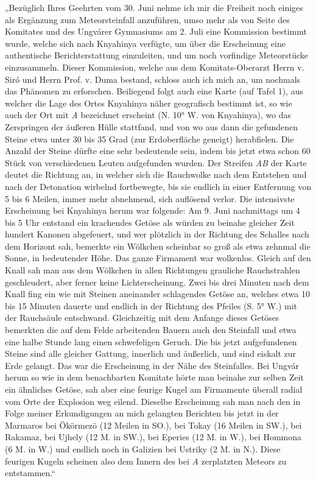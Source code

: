 \documentclass[a4paper, 11pt, oneside, german]{article}
\begin{document}
„Bezüglich Ihres Geehrten vom 30. Juni nehme ich mir die Freiheit noch einiges als Ergänzung zum Meteorsteinfall anzuführen, umso mehr als von Seite des Komitates und des Ungvárer Gymnasiums am 2. Juli eine Kommission bestimmt wurde, welche sich nach Knyahinya verfügte, um über die Erscheinung eine authentische Berichterstattung einzuleiten, und um noch vorfindige Meteorstücke einzusammeln. Dieser Kommission, welche aus dem Komitats-Oberarzt Herrn v. Siró und Herrn Prof. v. Duma bestand, schloss auch ich mich an, um nochmals das Phänomen zu erforschen. Beiliegend folgt auch eine Karte (auf Tafel 1), aus welcher die Lage des Ortes Knyahinya näher geografisch bestimmt ist, so wie auch der Ort mit \emph{A} bezeichnet erscheint (N. 10° W. von Knyahinya), wo das Zerspringen der äußeren Hülle stattfand, und von wo aus dann die gefundenen Steine etwa unter 30 bis 35 Grad (zur Erdoberfläche geneigt) herabfielen. Die Anzahl der Steine dürfte eine sehr bedeutende sein, indem bis jetzt etwa schon 60 Stück von verschiedenen Leuten aufgefunden wurden. Der Streifen \emph{AB} der Karte deutet die Richtung an, in welcher sich die Rauchwolke nach dem Entstehen und nach der Detonation wirbelnd fortbewegte, bis sie endlich in einer Entfernung von 5 bis 6 Meilen, immer mehr abnehmend, sich auflösend verlor. Die intensivste Erscheinung bei Knyahinya herum war folgende: Am 9. Juni nachmittags um 4 bis 5 Uhr entstand ein krachendes Getöse als würden zu beinahe gleicher Zeit hundert Kanonen abgefeuert, und wer plötzlich in der Richtung des Schalles nach dem Horizont sah, bemerkte ein Wölkchen scheinbar so groß als etwa zehnmal die Sonne, in bedeutender Höhe. Das ganze Firmament war wolkenlos. Gleich auf den Knall sah man aus dem Wölkchen in allen Richtungen grauliche Rauchstrahlen geschleudert, aber ferner keine Lichterscheinung. Zwei bis drei Minuten nach dem Knall fing ein wie mit Steinen aneinander schlagendes Getöse an, welches etwa 10 bis 15 Minuten dauerte und endlich in der Richtung des Pfeiles (S. 5° W.) mit der Rauchsäule entschwand. Gleichzeitig mit dem Anfange dieses Getöses bemerkten die auf dem Felde arbeitenden Bauern auch den Steinfall und etwa eine halbe Stunde lang einen schwefeligen Geruch. Die bis jetzt aufgefundenen Steine sind alle gleicher Gattung, innerlich und äußerlich, und sind eiskalt zur Erde gelangt. Das war die Erscheinung in der Nähe des Steinfalles. Bei Ungvár herum so wie in dem benachbarten Komitate hörte man beinahe zur selben Zeit ein ähnliches Getöse, sah aber eine feurige Kugel am Firmamente überall radial vom Orte der Explosion weg eilend. Dieselbe Erscheinung sah man nach den in Folge meiner Erkundigungen an mich gelangten Berichten bis jetzt in der Marmaros bei Ökörmezö (12 Meilen in SO.), bei Tokay (16 Meilen in SW.), bei Rakamaz, bei Ujhely (12 M. in SW.), bei Eperies (12 M. in W.), bei Hommona (6 M. in W.) und endlich noch in Galizien bei Ustriky (2 M. in N.). Diese feurigen Kugeln scheinen also dem Innern des bei \emph{A} zerplatzten Meteors zu entstammen.“
\end{document}

